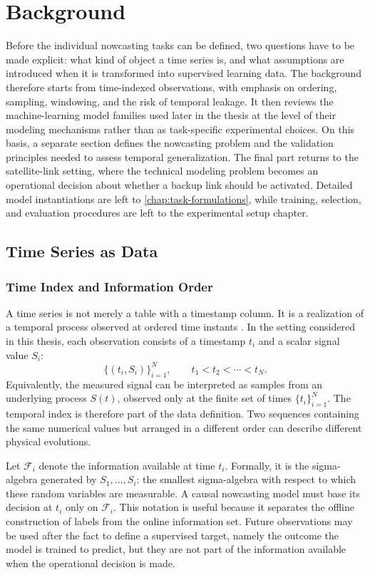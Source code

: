 \chapter{Background}
\label{chap:background}

Before the individual nowcasting tasks can be defined, two questions have to be
made explicit: what kind of object a time series is, and what assumptions are
introduced when it is transformed into supervised learning data. The background
therefore starts from time-indexed observations, with emphasis on ordering,
sampling, windowing, and the risk of temporal leakage. It then reviews the
machine-learning model families used later in the thesis at the level of their
modeling mechanisms rather than as task-specific experimental choices. On this
basis, a separate section defines the nowcasting problem and the validation
principles needed to assess temporal generalization. The final part returns to
the satellite-link setting, where the technical modeling
problem becomes an operational decision about whether a backup link should be
activated. Detailed model instantiations are left to
\cref{chap:task-formulations}, while training, selection, and evaluation
procedures are left to the experimental setup chapter.

\section{Time Series as Data}
\label{sec:background-time-series}

\subsection{Time Index and Information Order}

A time series is not merely a table with a timestamp column. It is a realization
of a temporal process observed at ordered time instants
\cite{brockwell2016introduction,shumway2017time}. In the setting considered in
this thesis, each observation consists of a timestamp \(t_i\) and a scalar signal
value \(S_i\):
\[
  \{(t_i,S_i)\}_{i=1}^{N},
  \qquad
  t_1 < t_2 < \cdots < t_N .
\]
Equivalently, the measured signal can be interpreted as samples from an
underlying process \(S(t)\), observed only at the finite set of times
\(\{t_i\}_{i=1}^{N}\). The temporal index is therefore part of the data
definition. Two sequences containing the same numerical values but arranged in a
different order can describe different physical evolutions.

Let \(\mathcal{F}_i\) denote the information available at time \(t_i\).
Formally, it is the sigma-algebra generated by \(S_1,\ldots,S_i\): the smallest
sigma-algebra with respect to which these random variables are measurable.
A causal nowcasting model must base its decision at \(t_i\) only
on \(\mathcal{F}_i\). This notation is useful because it separates the offline
construction of labels from the online information set. Future observations may
be used after the fact to define a supervised target, namely the outcome the
model is trained to predict, but they are not part of the information available
when the operational decision is made.

